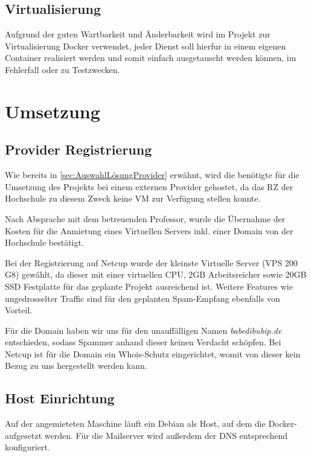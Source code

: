 \documentclass[a4paper,11pt,singlespacing]{article}
\begin{document}
		
	\subsection{Virtualisierung}\label{sec:AuswahlLösungVirtualisierung}
		Aufgrund der guten Wartbarkeit und Änderbarkeit wird im Projekt zur Virtualisierung Docker verwendet, jeder Dienst soll hierfur in einem eigenen Container realisiert werden und somit einfach ausgetauscht werden können, im Fehlerfall oder zu Testzwecken.

\newpage


\section{Umsetzung}\label{sec:Umsetzung}
	
	\subsection{Provider Registrierung}\label{sec:ProviderRegistrierung} 
		Wie bereits in \autoref{sec:AuswahlLösungProvider} erwähnt, wird die benötigte  für die Umsetzung des Projekts bei einem externen Provider gehostet, da das RZ der Hochschule zu diesem Zweck keine VM zur Verfügung stellen konnte.
		
		Nach Absprache mit dem betreuenden Professor, wurde die Übernahme der Kosten für die Anmietung eines Virtuellen Servers inkl. einer Domain von der Hochschule bestätigt.  
		
		Bei der Registrierung auf \textsf{Netcup} wurde der kleinste Virtuelle Server (VPS 200 G8) gewählt, da dieser mit einer virtuellen CPU, 2GB Arbeitsreicher sowie 20GB SSD Festplatte für das geplante Projekt ausreichend ist. Weitere Features wie ungedrosselter Traffic sind für den geplanten Spam-Empfang ebenfalls von Vorteil.
		
		Für die Domain haben wir uns für den unauffälligen Namen \textit{babedibubip.de} entschieden, sodass Spammer anhand dieser keinen Verdacht schöpfen. Bei \textsf{Netcup} ist für die Domain ein Whois-Schutz eingerichtet, womit von dieser kein Bezug zu uns hergestellt werden kann. 
		
		
	\subsection{Host Einrichtung}\label{sec:UmsetzungHostEinrichtung}
		Auf der angemieteten Maschine läuft ein Debian als Host, auf dem die Docker- aufgesetzt werden. Für die Mailserver wird außerdem der DNS entsprechend konfiguriert.
		
\end{document}
